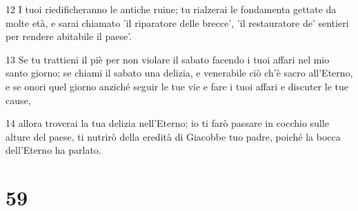 \par 12 I tuoi riedificheranno le antiche ruine; tu rialzerai le fondamenta gettate da molte età, e sarai chiamato 'il riparatore delle brecce', 'il restauratore de' sentieri per rendere abitabile il paese'.
\par 13 Se tu trattieni il piè per non violare il sabato facendo i tuoi affari nel mio santo giorno; se chiami il sabato una delizia, e venerabile ciò ch'è sacro all'Eterno, e se onori quel giorno anziché seguir le tue vie e fare i tuoi affari e discuter le tue cause,
\par 14 allora troverai la tua delizia nell'Eterno; io ti farò passare in cocchio sulle alture del paese, ti nutrirò della eredità di Giacobbe tuo padre, poiché la bocca dell'Eterno ha parlato.

\chapter{59}

